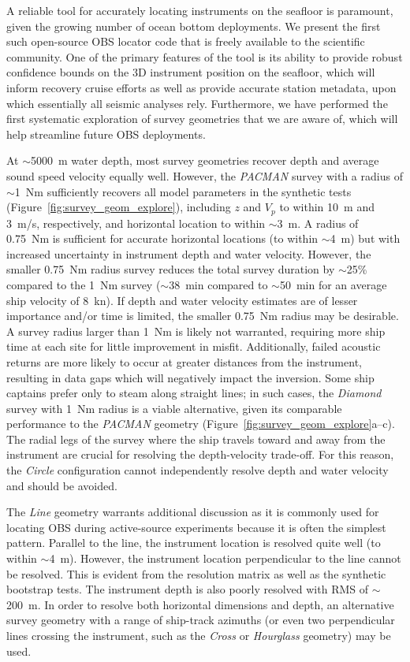 A reliable tool for accurately locating instruments on the seafloor is paramount, given the growing number of ocean bottom deployments. We present the first such open-source OBS locator code that is freely available to the scientific community. One of the primary features of the tool is its ability to provide robust confidence bounds on the 3D instrument position on the seafloor, which will inform recovery cruise efforts as well as provide accurate station metadata, upon which essentially all seismic analyses rely. Furthermore, we have performed the first systematic exploration of survey geometries that we are aware of, which will help streamline future OBS deployments.

At $\sim$5000~m water depth, most survey geometries recover depth and average sound speed velocity equally well. However, the \textit{PACMAN} survey with a radius of $\sim$1~Nm sufficiently recovers all model parameters in the synthetic tests (Figure~\ref{fig:survey_geom_explore}), including $z$ and $V_p$ to within 10~m and 3~m/s, respectively, and horizontal location to within $\sim$3~m. A radius of 0.75~Nm is sufficient for accurate horizontal locations (to within $\sim$4~m) but with increased uncertainty in instrument depth and water velocity. However, the smaller 0.75~Nm radius survey reduces the total survey duration by $\sim$25\% compared to the 1~Nm survey ($\sim$38~min compared to $\sim$50~min for an average ship velocity of 8~kn). If depth and water velocity estimates are of lesser importance and/or time is limited, the smaller 0.75~Nm radius may be desirable. A survey radius larger than 1~Nm is likely not warranted, requiring more ship time at each site for little improvement in misfit. Additionally, failed acoustic returns are more likely to occur at greater distances from the instrument, resulting in data gaps which will negatively impact the inversion. Some ship captains prefer only to steam along straight lines; in such cases, the \textit{Diamond} survey with 1~Nm radius is a viable alternative, given its comparable performance to the \textit{PACMAN} geometry (Figure~\ref{fig:survey_geom_explore}a--c). The radial legs of the survey where the ship travels toward and away from the instrument are crucial for resolving the depth-velocity trade-off. For this reason, the \textit{Circle} configuration cannot independently resolve depth and water velocity and should be avoided.

The \textit{Line} geometry warrants additional discussion as it is commonly used for locating OBS during active-source experiments because it is often the simplest pattern. Parallel to the line, the instrument location is resolved quite well (to within $\sim$4~m). However, the instrument location perpendicular to the line cannot be resolved. This is evident from the resolution matrix as well as the synthetic bootstrap tests. The instrument depth is also poorly resolved with RMS of $\sim$200~m. In order to resolve both horizontal dimensions and depth, an alternative survey geometry with a range of ship-track azimuths (or even two perpendicular lines crossing the instrument, such as the \textit{Cross} or \textit{Hourglass} geometry) may be used.

